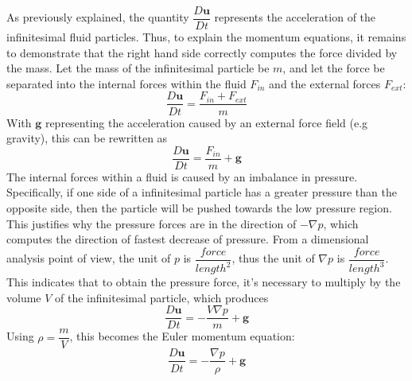 As previously explained, the quantity $\dfrac{D\textbf{u}}{Dt}$ represents the acceleration of the infinitesimal fluid particles. Thus, to explain the momentum equations, it remains to demonstrate that the right hand side correctly computes the force divided by the mass. Let the mass of the infinitesimal particle be $m$, and let the force be separated into the internal forces within the fluid $F_{in}$ and the external forces $F_{ext}$:
$$
\dfrac{D\textbf{u}}{Dt} = \frac{F_{in} + F_{ext}}{m}
$$
With $\textbf{g}$ representing the acceleration caused by an external force field (e.g gravity), this can be rewritten as
$$
\dfrac{D\textbf{u}}{Dt} = \frac{F_{in}}{m} + \textbf{g}
$$
The internal forces within a fluid is caused by an imbalance in pressure. Specifically, if one side of a infinitesimal particle has a greater pressure than the opposite side, then the particle will be pushed towards the low pressure region. This justifies why the pressure forces are in the direction of $-\nabla p$, which computes the direction of fastest decrease of pressure. From a dimensional analysis point of view, the unit of $p$ is $\dfrac{force}{length^2}$, thus the unit of $\nabla p$ is $\dfrac{force}{length^3}$. This indicates that to obtain the pressure force, it's necessary to multiply by the volume $V$ of the infinitesimal particle, which produces
$$
\dfrac{D\textbf{u}}{Dt} = -\frac{V \nabla p}{m} + \textbf{g}
$$
Using $\rho = \dfrac{m}{V}$, this becomes the Euler momentum equation:
$$
\dfrac{D\textbf{u}}{Dt} =  -\frac{\nabla p}{\rho} + \textbf{g}
$$

